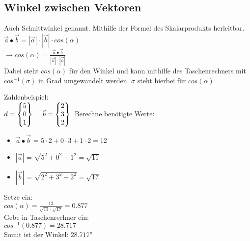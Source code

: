 \subsection{Winkel zwischen Vektoren}
\label{sec:winkel_vektoren}
Auch Schnittwinkel genannt. Mithilfe der Formel des Skalarprodukts herleitbar. \\
$\vec{a} \bullet \vec{b} = |\vec{a}| \cdot |\vec{b}| \cdot cos(\alpha)$ \\
$\rightarrow cos(\alpha) = \frac{\vec{a}\bullet \vec{b}}{|\vec{a}|\cdot |\vec{b}|}$ \\
Dabei steht $cos(\alpha)$ für den Winkel und kann mithilfe des Taschenrechners mit $cos^{-1}(\sigma)$ in Grad umgewandelt werden. 
$\sigma$ steht hierbei für $cos(\alpha)$ 
\par
Zahlenbeispiel: \\
$
\vec{a} = 
\begin{Bmatrix}
    5 \\ 0 \\ 1
\end{Bmatrix} 
\ \ \ \
\vec{b} = 
\begin{Bmatrix}
    2 \\ 3 \\ 2
\end{Bmatrix} \\
$
Berechne benötigte Werte:
\begin{itemize}
    \item $\vec{a} \bullet \vec{b}$ = $5 \cdot 2 + 0 \cdot 3 + 1 \cdot 2 = 12$
    \item $|\vec{a}|$ = $\sqrt{5^2 + 0^2 + 1^2} = \sqrt{11}$
    \item $|\vec{b}|$ = $\sqrt{2^2 + 3^2 + 2^2} = \sqrt{17}$
\end{itemize}
Setze ein: \\
$cos(\alpha) = \frac{12}{\sqrt{11}\cdot \sqrt{17}} = 0.877$ \\
Gebe in Taschenrechner ein: \\
$cos^{-1}(0.877) = 28.717$ \\
Somit ist der Winkel: $28.717$°
